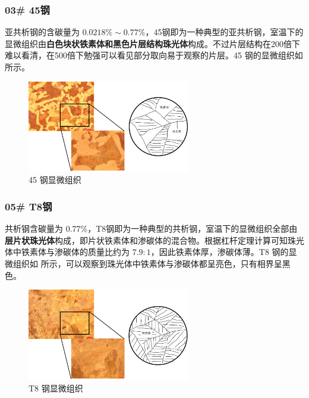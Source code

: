 \documentclass[a4paper,utf8]{article}
\begin{document}
        \subsubsection{03# 45钢}
            亚共析钢的含碳量为 $0.0218\%\sim 0.77\%$，45钢即为一种典型的亚共析钢，室温下的显微组织由\textbf{白色块状铁素体和黑色片层结构珠光体}构成。不过片层结构在200倍下难以看清，在500倍下勉强可以看见部分取向易于观察的片层。45 钢的显微组织如 所示。
            \begin{figure}[!ht]
                \includegraphics[height=40mm]{result/2.pdf}
                \caption{45 钢显微组织\label{fig:2}}
            \end{figure}

        \subsubsection{05# T8钢}
            共析钢含碳量为 0.77\%，T8钢即为一种典型的共析钢，室温下的显微组织全部由\textbf{层片状珠光体}构成，即片状铁素体和渗碳体的混合物。根据杠杆定理计算可知珠光体中铁素体与渗碳体的质量比约为 $7.9:1$，因此铁素体厚，渗碳体薄。T8 钢的显微组织如 所示，可以观察到珠光体中铁素体与渗碳体都呈亮色，只有相界呈黑色。
            \begin{figure}[!ht]
                \includegraphics[height=40mm]{result/3.pdf}
                \caption{T8 钢显微组织\label{fig:3}}
            \end{figure}
\end{document}
